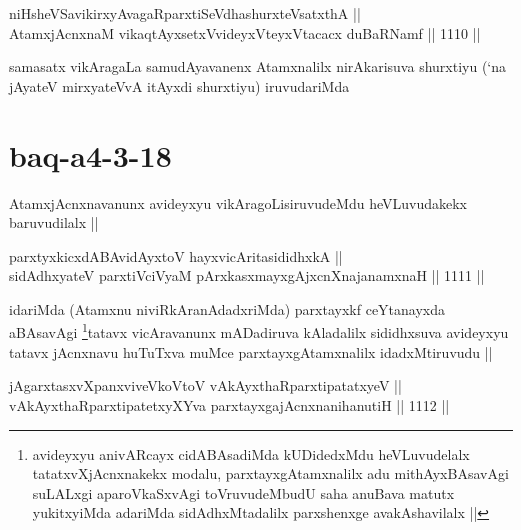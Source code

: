 
\begin{shl}
niHsheVSavikirxyAvagaRparxtiSeVdhashurxteVsatxthA || \\
AtamxjAcnxnaM vikaqtAyx\s \s setxV\s videyxVteyxVtacacx duBaRNamf ||  1110 ||  
\end{shl}

\begin{artha}
samasatx vikAragaLa samudAyavanenx Atamxnalilx nirAkarisuva shurxtiyu (`na jAyateV mirxyateVvA itAyxdi shurxtiyu) iruvudariMda
\end{artha}

\section*{baq-a4-3-18}

\begin{artha}
AtamxjAcnxnavanunx avideyxyu vikAragoLisiruvudeMdu heVLuvudakekx baruvudilalx ||
\end{artha}


\begin{shl}
parxtyxkicxdABAvidAyx\s toV hayxvicAritasididhxkA || \\
sidAdhxyateV parxtiVciVyaM pArxkasxmayxgAjxcnXnajanamxnaH ||  1111 || 
\end{shl}

\begin{artha}
idariMda (Atamxnu niviRkAranAdadxriMda) parxtayxkf ceYtanayxda aBAsavAgi \footnote{avideyxyu anivARcayx cidABAsadiMda kUDidedxMdu heVLuvudelalx tatatxvXjAcnxnakekx modalu, parxtayxgAtamxnalilx adu mithAyxBAsavAgi suLALxgi aparoVkaSxvAgi toVruvudeMbudU saha anuBava matutx yukitxyiMda adariMda sidAdhxMtadalilx parxshenxge avakAshavilalx ||}tatavx vicAravanunx mADadiruva kAladalilx sididhxsuva avideyxyu tatavx jAcnxnavu huTuTxva muMce parxtayxgAtamxnalilx idadxMtiruvudu ||
\end{artha}


\begin{shl}
jAgarxtasxvXpanxviveVkoV\s toV vAkAyxthaRparxtipatatxyeV || \\
vAkAyxthaRparxtipatetxyXYva parxtayxgajAcnxnanihanutiH ||  1112 ||  
\end{shl}

